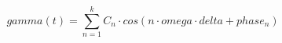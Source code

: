 \documentclass[12pt]{article}
\begin{document}
$$
   gamma(t) = \sum_{n = 1}^{k} C_{n} \cdot cos(n \cdot omega \cdot delta+ phase_n)  
$$
\end{document}

